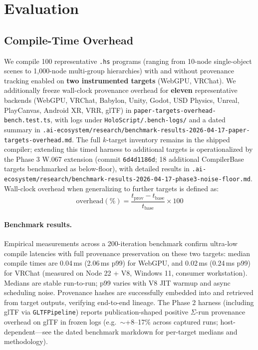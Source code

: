 \documentclass[sigconf,nonacm]{acmart}
\newcommand{\hscore}{\texttt{.hs}}
\begin{document}
\section{Evaluation}
\label{sec:eval}

\subsection{Compile-Time Overhead}

We compile 100 representative \hscore{} programs (ranging from
10-node single-object scenes to 1{,}000-node multi-group
hierarchies) with and without provenance tracking enabled on
\textbf{two instrumented targets} (WebGPU, VRChat). We additionally freeze
wall-clock provenance overhead for \textbf{eleven} representative backends
(WebGPU, VRChat, Babylon, Unity, Godot, USD Physics, Unreal, PlayCanvas, Android XR, VRR, glTF) in
\texttt{paper-targets-overhead-bench.test.ts}, with logs under
\texttt{HoloScript/.bench-logs/} and a dated summary in
\texttt{.ai-ecosystem/research/benchmark-results-2026-04-17-paper-targets-overhead.md}.
The full $k$-target inventory remains in the shipped compiler; extending this timed harness
to additional targets is operationalized by the Phase 3 W.067 extension
(commit \texttt{6d4d1186d}; 18 additional CompilerBase targets benchmarked as below-floor),
with detailed results in
\texttt{.ai-ecosystem/research/benchmark-results-2026-04-17-phase3-noise-floor.md}.
Wall-clock overhead
when generalizing to further targets is defined as:
$$\text{overhead}(\%) = \frac{t_{\text{prov}} - t_{\text{base}}}
  {t_{\text{base}}} \times 100$$

\paragraph{Benchmark results.}
Empirical measurements across a 200-iteration benchmark confirm ultra-low
compile latencies with full provenance preservation on these two targets:
median compile times are 0.04\,ms (2.06\,ms p99) for WebGPU, and 0.02\,ms (0.24\,ms p99) for VRChat
(measured on Node 22 + V8, Windows 11, consumer workstation). Medians are
stable run-to-run; p99 varies with V8 JIT warmup and async scheduling noise.
Provenance hashes are successfully embedded into and retrieved from target
outputs, verifying end-to-end lineage. The Phase 2 harness (including
glTF via \texttt{GLTFPipeline}) reports publication-shaped positive $\Sigma$-run provenance overhead on glTF in frozen logs (e.g.\ $\sim$+8--17\% across captured runs; host-dependent---see the dated benchmark markdown for per-target medians and methodology).
\end{document}
